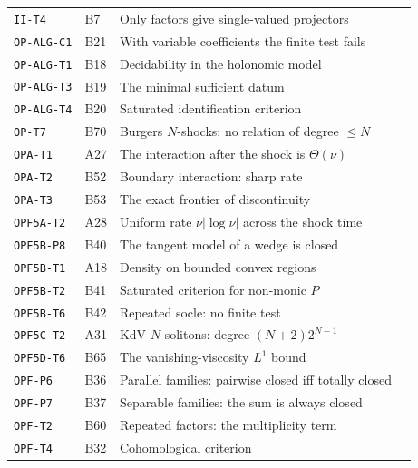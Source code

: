 \begin{center}
\begin{longtable}{@{}L{3.0cm}L{1.2cm}L{8.4cm}L{1.2cm}@{}}
\texttt{II-T4} & B7 & Only factors give single-valued projectors & \pageref{dim:II-T4}\\
\texttt{OP-ALG-C1} & B21 & With variable coefficients the finite test fails & \pageref{dim:OP-ALG-C1}\\
\texttt{OP-ALG-T1} & B18 & Decidability in the holonomic model & \pageref{dim:OP-ALG-T1}\\
\texttt{OP-ALG-T3} & B19 & The minimal sufficient datum & \pageref{dim:OP-ALG-T3}\\
\texttt{OP-ALG-T4} & B20 & Saturated identification criterion & \pageref{dim:OP-ALG-T4}\\
\texttt{OP-T7} & B70 & Burgers $N$-shocks: no relation of degree $\le N$ & \pageref{dim:OP-T7}\\
\texttt{OPA-T1} & A27 & The interaction after the shock is $\Theta(\nu)$ & \pageref{dim:OPA-T1}\\
\texttt{OPA-T2} & B52 & Boundary interaction: sharp rate & \pageref{dim:OPA-T2}\\
\texttt{OPA-T3} & B53 & The exact frontier of discontinuity & \pageref{dim:OPA-T3}\\
\texttt{OPF5A-T2} & A28 & Uniform rate $\nu|\log\nu|$ across the shock time & \pageref{dim:OPF5A-T2}\\
\texttt{OPF5B-P8} & B40 & The tangent model of a wedge is closed & \pageref{dim:OPF5B-P8}\\
\texttt{OPF5B-T1} & A18 & Density on bounded convex regions & \pageref{dim:OPF5B-T1}\\
\texttt{OPF5B-T2} & B41 & Saturated criterion for non-monic $P$ & \pageref{dim:OPF5B-T2}\\
\texttt{OPF5B-T6} & B42 & Repeated socle: no finite test & \pageref{dim:OPF5B-T6}\\
\texttt{OPF5C-T2} & A31 & KdV $N$-solitons: degree $(N+2)2^{N-1}$ & \pageref{dim:OPF5C-T2}\\
\texttt{OPF5D-T6} & B65 & The vanishing-viscosity $L^1$ bound & \pageref{dim:OPF5D-T6}\\
\texttt{OPF-P6} & B36 & Parallel families: pairwise closed iff totally closed & \pageref{dim:OPF-P6}\\
\texttt{OPF-P7} & B37 & Separable families: the sum is always closed & \pageref{dim:OPF-P7}\\
\texttt{OPF-T2} & B60 & Repeated factors: the multiplicity term & \pageref{dim:OPF-T2}\\
\texttt{OPF-T4} & B32 & Cohomological criterion & \pageref{dim:OPF-T4}\\

\end{longtable}
\end{center}

